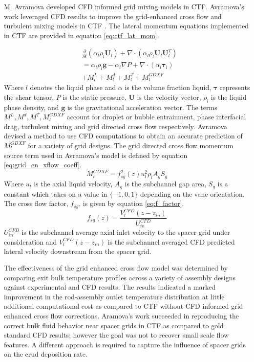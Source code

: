  M. Avramova developed CFD informed grid mixing models in CTF.  Avramova's work leveraged CFD results to improve the grid-enhanced cross flow and turbulent mixing models in CTF \cite{avramova2007}.  The lateral momentum equations implemented in CTF are provided in equation \ref{eq:ctf_lat_mom}.

    	\begin{align}
    	& \frac{\partial }{\partial t}(\alpha_l \rho_l \mathbf U_l)
    	+ \nabla \cdot (\alpha_l \rho_l \mathbf U_l \mathbf U_l^T) \nonumber \\
    	&= \alpha_l \rho_l \mathbf{g} - \alpha_l \nabla P + 
    	\nabla \cdot (\alpha_l \bm{\tau}_l) \nonumber \\
    	&+ M^L_l + M^d_l + M^T_l + M_l^{GDXF}
        \label{eq:ctf_lat_mom}
    	\end{align}
Where $l$ denotes the liquid phase and $\alpha$ is the volume fraction liquid, $\bm \tau$ represents the shear tensor, $P$ is the static pressure, $\mathbf U$ is the velocity vector, $\rho_l$ is the liquid phase density, and $\mathbf g$ is the gravitational acceleration vector.  The terms $M^L, M^d, M^T, M_l^{GDXF}$ account for droplet or bubble entrainment, phase interfacial drag, turbulent mixing and grid directed cross flow respectively.  Avramova devised a method to use CFD computations to obtain an accurate prediction of $M_l^{GDXF}$ for a variety of grid designs.
The grid directed cross flow momentum source term used in Avramova's model is defined by equation \ref{eq:grid_en_xflow_coeff}.
    	\begin{equation}
    	M_l^{GDXF} = f^2_{sg}(z) u_l^2 \rho_l A_g S_g
        \label{eq:grid_en_xflow_coeff}
    	\end{equation}
        Where $u_l$ is the axial liquid velocity, $A_g$ is the subchannel gap area, $S_g$ is a constant which takes on a value in $\{-1, 0, 1\}$ depending on the vane orientation. The cross flow factor, $f_{sg}$, is given by equation \ref{eq:f_factor}.
    	\begin{equation}
    	f_{sg}(z) = \frac{V^{CFD}_l(z-z_{in})}{U^{CFD}_{in}}
        \label{eq:f_factor}
    	\end{equation}
        $U^{CFD}_{in}$ is the subchannel average axial inlet velocity to the spacer grid under consideration and $V^{CFD}_l(z-z_{in})$ is the subchannel averaged CFD predicted lateral velocity downstream from the spacer grid.

 The effectiveness of the grid enhanced cross flow model was determined by comparing exit bulk temperature profiles across a variety of assembly designs against experimental and CFD results.  The results indicated a marked improvement in the rod-assembly outlet temperature distribution at little additional computational cost as compared to CTF without CFD informed grid enhanced cross flow corrections.    Aramova's work succeeded in reproducing the correct bulk fluid behavior near spacer grids in CTF as compared to gold standard CFD results; however the goal was not to recover small scale flow features.  A different approach is required to capture the influence of spacer grids on the crud deposition rate.
 

